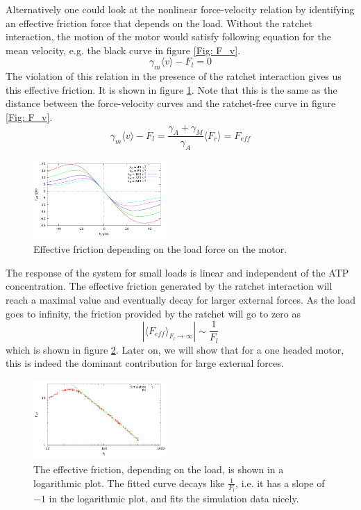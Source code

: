 \documentclass[aps,pre,twocolumn,showpacs,showkeys,a4paper]{revtex4}
\begin{document}
Alternatively one could look at the nonlinear force-velocity relation by identifying an effective friction force that depends on the load. 
Without the ratchet interaction, the motion of the motor would satisfy following equation for the mean velocity, e.g. the black curve in figure \ref{Fig: F_v}.
\begin{equation*}
\gamma_{m}\langle v\rangle - F_{l} = 0
\end{equation*}
The violation of this relation in the presence of the ratchet interaction gives us this effective friction. 
It is shown in figure \ref{Fig: effective_friction}. 
Note that this is the same as the distance between the force-velocity curves and the ratchet-free curve in figure \ref{Fig: F_v}.
\begin{equation*}
\gamma_{m} \langle v \rangle - F_{l} = \frac{\gamma_A + \gamma_M}{\gamma_A} \langle F_r \rangle = F_{eff}
\end{equation*}
\begin{figure}[t]
\centering
\includegraphics[width=0.45\textwidth,height=!]{effective_friction}
\caption{Effective friction depending on the load force on the motor.}
\label{Fig: effective_friction}
\end{figure}
The response of the system for small loads is linear and independent of the ATP concentration. 
The effective friction generated by the ratchet interaction will reach a maximal value and eventually decay for larger external forces. 
As the load goes to infinity, the friction provided by the ratchet will go to zero as 
\begin{equation*}
\left| \langle F_{eff} \rangle_{F_l\rightarrow\infty} \right| \sim \frac{1}{F_l}
\end{equation*} 
which is shown in figure \ref{Fig: eff_frict_decay}. 
Later on, we will show that for a one headed motor, this is indeed the dominant contribution for large external forces.  
\begin{figure}[b]
\centering
\includegraphics[width=0.45\textwidth,height=!]{eff_frict_decay}
\caption{The effective friction, depending on the load, is shown in a logarithmic plot. 
The fitted curve decays like $\frac{1}{F_l}$, i.e. it has a slope of $-1$ in the logarithmic plot, and fits the simulation data nicely.}
\label{Fig: eff_frict_decay}
\end{figure}
\end{document}
